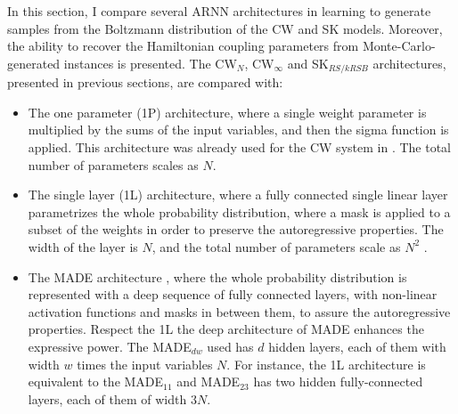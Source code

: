 \documentclass[aps,physrev,10pt,floatfix,reprint]{revtex4-2}
\begin{document}
In this section, I compare several ARNN architectures in learning to generate samples from the Boltzmann distribution of the CW and SK models. 
Moreover, the ability to recover the Hamiltonian coupling parameters from Monte-Carlo-generated instances is presented. 
The CW$_N$, CW$_{\infty}$ and SK$_{RS/kRSB}$ architectures, presented in previous sections, are compared with: 
\begin{itemize}
    \item The one parameter (1P) architecture, where a single weight parameter is multiplied by the sums of the input variables, and then the sigma function is applied. This architecture was already used for the CW system in \cite{https://doi.org/10.48550/arxiv.2210.11145}. The total number of parameters scales as $N$.
    \item The single layer (1L) architecture, where a fully connected single linear layer parametrizes the whole probability distribution, where a mask is applied to a subset of the weights in order to preserve the autoregressive properties. The width of the layer is $N$, and the total number of parameters scale as $N^2$ \cite{pmlr-v37-germain15}.
    \item The MADE architecture \cite{pmlr-v37-germain15}, where the whole probability distribution is represented with a deep sequence of fully connected layers, with non-linear activation functions and masks in between them, to assure the autoregressive properties. Respect the 1L the deep architecture of MADE enhances the expressive power. The MADE$_{dw}$ used has $d$ hidden layers, each of them with width $w$ times the input variables $N$. For instance, the 1L architecture is equivalent to the MADE$_{11}$ and MADE$_{23}$ has two hidden fully-connected layers, each of them of width $3N$. 
\end{itemize}
\end{document}
